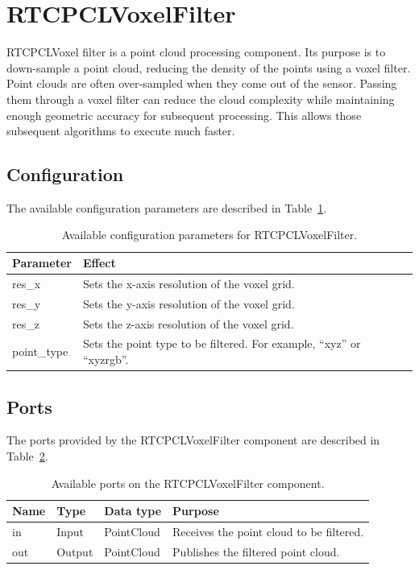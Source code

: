 \documentclass[a4paper,10pt]{article}
\begin{document}
\section{RTCPCLVoxelFilter}
\label{sec:rtcpclvoxelfilter}

RTCPCLVoxel filter is a point cloud processing component. Its purpose is to
down-sample a point cloud, reducing the density of the points using a voxel
filter. Point clouds are often over-sampled when they come out of the sensor.
Passing them through a voxel filter can reduce the cloud complexity while
maintaining enough geometric accuracy for subsequent processing. This allows
those subsequent algorithms to execute much faster.

\subsection{Configuration}
\label{sec1:voxelfilter_configuration}

The available configuration parameters are described in
Table~\ref{tab:voxelfilter_config_params}.

\begin{table}[t]
  \centering
  \begin{tabularx}{\columnwidth}{lX}
    \toprule
    Parameter & Effect \\
    \midrule
    res\_x & Sets the x-axis resolution of the voxel grid. \\
    res\_y & Sets the y-axis resolution of the voxel grid. \\
    res\_z & Sets the z-axis resolution of the voxel grid. \\
    point\_type & Sets the point type to be filtered. For example, ``xyz'' or ``xyzrgb''. \\
    \bottomrule
  \end{tabularx}
  \caption{Available configuration parameters for RTCPCLVoxelFilter.}
  \label{tab:voxelfilter_config_params}
\end{table}

\subsection{Ports}
\label{sec1:voxelfilter_port}

The ports provided by the RTCPCLVoxelFilter component are described in Table~\ref{tab:voxelfilter_ports}.

\begin{table}[t]
  \centering
  \begin{tabularx}{\columnwidth}{lllX}
    \toprule
    Name & Type & Data type & Purpose \\
    \midrule
    in & Input & PointCloud & Receives the point cloud to be filtered. \\
    out & Output & PointCloud & Publishes the filtered point cloud. \\
    \bottomrule
  \end{tabularx}
  \caption{Available ports on the RTCPCLVoxelFilter component.}
  \label{tab:voxelfilter_ports}
\end{table}
\end{document}
